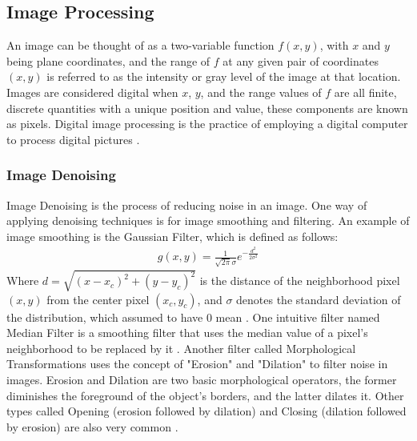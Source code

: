 \documentclass[12pt]{diazessay}
\begin{document}
    \subsection{Image Processing}
    \hspace{0.7cm} An image can be thought of as a two-variable function $f(x, y)$, with $x$ and $y$ being plane coordinates, and the range of $f$ at any given pair of coordinates $(x, y)$ is referred to as the intensity or gray level of the image at that location. Images are considered digital when $x$, $y$, and the range values of $f$ are all finite, discrete quantities with a unique position and value, these components are known as pixels. Digital image processing is the practice of employing a digital computer to process digital pictures \cite{Gonzalez2001-hg}.
    
    \subsubsection{Image Denoising}
    \hspace{0.7cm} Image Denoising is the process of reducing noise in an image. One way of applying denoising techniques is for image smoothing and filtering. An example of image smoothing is the Gaussian Filter, which is defined as follows:
    \begin{equation*}
        \begin{aligned}
            g(x,y) = \frac{1}{\sqrt{2\pi}\sigma}e^{-\frac{d^2}{2\sigma^2}}
        \end{aligned}
    \end{equation*}
    Where $d = \sqrt{(x - x_{c})^2 + (y - y_{c})^2}$ is the distance of the neighborhood pixel $(x, y)$ from the center pixel $(x_{c}, y_{c})$, and $\sigma$ denotes the standard deviation of the distribution, which assumed to have 0 mean \cite{Stockman2001-vr}.
    One intuitive filter named Median Filter is a smoothing filter that uses the median value of a pixel's neighborhood to be replaced by it \cite{Stockman2001-vr}.
    Another filter called Morphological Transformations uses the concept of "Erosion" and "Dilation" to filter noise in images. Erosion and Dilation are two basic morphological operators, the former diminishes the foreground of the object's borders, and the latter dilates it. Other types called Opening (erosion followed by dilation) and Closing (dilation followed by erosion) are also very common \cite{Jain1988-vj}.
\end{document}
